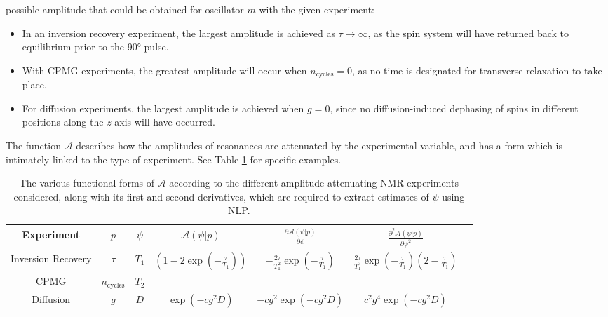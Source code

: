 possible amplitude that could be obtained for oscillator $m$ with the given
experiment:
\begin{itemize}
    \item In an inversion recovery experiment, the largest amplitude is
        achieved as $\tau \rightarrow \infty$, as the spin system will have
        returned back to equilibrium prior to the \ang{90} pulse.
    \item With \ac{CPMG} experiments, the greatest amplitude will occur when
        $n_{\text{cycles}} = 0$, as no time is designated for transverse
        relaxation to take place.
    \item For diffusion experiments, the largest amplitude is achieved when
        $g=0$, since no diffusion-induced dephasing of spins in different
        positions along the $z$-axis will have occurred.
\end{itemize}
The function $\mathcal{A}$ describes how the amplitudes of resonances are
attenuated by the experimental variable, and has a form which is intimately
linked to the type of experiment. See Table \ref{tab:seq-equations} for
specific examples.
\begin{table}
    \begin{center}
        \begin{tabular}{ccccccc}
            \hline
            Experiment &
            $p$ &
            $\psi$ &
            $\mathcal{A}(\psi | p)$ &
            $\frac{\partial \mathcal{A}(\psi | p)}{\partial \psi}$ &
            $\frac{\partial^2 \mathcal{A}(\psi | p)}{\partial \psi^2}$ \\ \hline
            Inversion Recovery &
            $\tau$ &
            $T_1$ &
            $\left(1 - 2 \exp \left(-\frac{\tau}{T_{1}}\right)\right)$ &
            $-\frac{2 \tau}{T_1^2} \exp\left(-\frac{\tau}{T_1}\right)$ &
            $\frac{2 \tau}{T_1^3} \exp\left(-\frac{\tau}{T_1}\right)\left(2 - \frac{\tau}{T_1}\right)$\\
            \acs{CPMG} &
            $n_{\textrm{cycles}}$ &
            $T_2$ &
            \note{?} &
            \note{?} &
            \note{?} \\
            Diffusion &
            $g$ &
            $D$ &
            $\exp\left(-c g^2 D\right)$ &
            $-c g^2 \exp\left(-c g^2 D\right)$ &
            $c^2 g^4 \exp\left(-c g^2 D\right)$ \\
            \hline
       \end{tabular}
       \caption[
           The various functional forms of $\mathcal{A}$ according to the
           different amplitude-attenuating NMR experiments considered.
       ]
       {
           The various functional forms of $\mathcal{A}$ according to the
           different amplitude-attenuating NMR experiments considered, along
           with its first and second derivatives, which are required to extract
           estimates of $\psi$ using \ac{NLP}.
       }
       \label{tab:seq-equations}
    \end{center}
\end{table}

